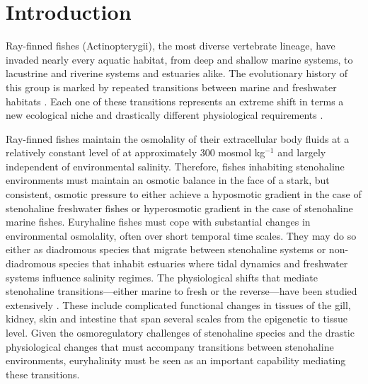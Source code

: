 \documentclass[11pt]{article}
\begin{document}
\newpage

\section*{Introduction}

Ray-finned fishes (Actinopterygii), the most diverse vertebrate lineage, have invaded nearly every aquatic habitat, from deep and shallow marine systems, to lacustrine and riverine systems and estuaries alike. The evolutionary history of this group is marked by repeated transitions between marine and freshwater habitats \citep{de2022patterns, bloom2012molecular, carrete2012there, davis2017widespread, corush2019evolutionary, rabosky2020speciation}. Each one of these transitions represents an extreme shift in terms a new ecological niche \citep{lee1999causes, carrete2012there,seehausen2014speciation, de2022patterns} and drastically different physiological requirements \citep{kultz2015physiological,evans2008}. 

Ray-finned fishes maintain the osmolality of their extracellular body fluids at a relatively constant level of at approximately 300 mosmol kg$^{-1}$ and largely independent of environmental salinity. Therefore, fishes inhabiting stenohaline environments must maintain an osmotic balance in the face of a stark, but consistent, osmotic pressure to either achieve a hyposmotic gradient in the case of stenohaline freshwater fishes or hyperosmotic gradient in the case of stenohaline marine fishes.  Euryhaline fishes must cope with substantial changes in environmental osmolality, often over short temporal time scales. They may do so either as diadromous species that migrate between stenohaline systems or non-diadromous species that inhabit estuaries where tidal dynamics and freshwater systems influence salinity regimes.  The physiological shifts that mediate stenohaline transitions---either marine to fresh or the reverse---have been studied extensively \citep{mccormick2013fish,kultz2015physiological,edwards2012principles,mccormick2001endocrine,mccormick1987preparatory}. These include complicated functional changes in tissues of the gill, kidney, skin and intestine that span several scales from the epigenetic to tissue level. Given the osmoregulatory challenges of stenohaline species and the drastic physiological changes that must accompany transitions between stenohaline environments, euryhalinity must be seen as an important capability mediating these transitions.
\end{document}
